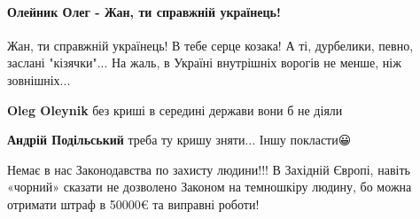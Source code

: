  
 
 
 
 
\paragraph{Олейник Олег - Жан, ти справжній українець!}
\label{sec:13_08_2021.fb.belenjuk_zhan.1.napadenie.cmt.olejnik_vragi}

\begin{itemize}
 
Жан, ти справжній українець! В тебе серце козака! А ті, дурбелики, певно, заслані "кізячки"...
На жаль, в Україні внутрішніх ворогів не менше, ніж зовнішніх...

\begin{itemize}
 
\textbf{Oleg Oleynik} без криші в середині держави вони б не діяли

 
\textbf{Андрій Подільський} треба ту кришу зняти... Іншу покласти😀
\end{itemize}

 

Немає в нас Законодавства по захисту людини!!! В Західній Європі, навіть
«чорний» сказати не дозволено Законом на темношкіру людину, бо можна отримати
штраф в 50000€ та виправні роботи!


\end{itemize}
